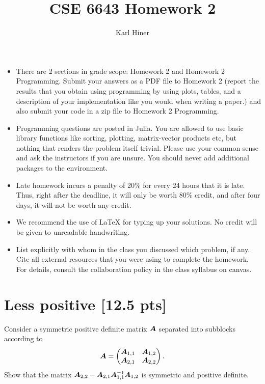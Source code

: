 \documentclass[twoside,10pt]{article}
\begin{document}
\title{CSE 6643 Homework 2}
\author{Karl Hiner}
\date{}
\maketitle

\begin{itemize}
  \item There are 2 sections in grade scope: Homework 2 and Homework 2 Programming. Submit your answers as a PDF file to Homework 2 (report the results that you obtain using programming by using plots, tables, and a description of your implementation like you would when writing a paper.) and also submit your code in a zip file to Homework 2 Programming. 
  \item Programming questions are posted in Julia. You are allowed to use basic library functions like sorting, plotting, matrix-vector products etc, but nothing that renders the problem itself trivial. Please use your common sense and ask the instructors if you are unsure. 
  You should never add additional packages to the environment.
  \item Late homework incurs a penalty of 20\% for every 24 hours that it is late. Thus, right after the deadline, it will only be worth 80\% credit, and after four days, it will not be worth any credit. 
  \item We recommend the use of LaTeX for typing up your solutions. No credit will be given to unreadable handwriting.
  \item List explicitly with whom in the class you discussed which problem, if any. Cite all external resources that you were using to complete the homework. For details, consult the collaboration policy in the class syllabus on canvas.
\end{itemize}

\section{Less positive [12.5 pts]} 

Consider a symmetric positive definite matrix $\bm{A}$ separated into subblocks according to
\begin{equation*}
  \bm{A} = \begin{pmatrix}
    \bm{A}_{1, 1} & \bm{A}_{1, 2} \\
    \bm{A}_{2, 1} & \bm{A}_{2, 2}
  \end{pmatrix}.
\end{equation*}
Show that the matrix $\bm{A}_{2,2} - \bm{A}_{2,1} \bm{A}_{1,1}^{-1} \bm{A}_{1,2}$ is symmetric and positive definite. 
\end{document}
